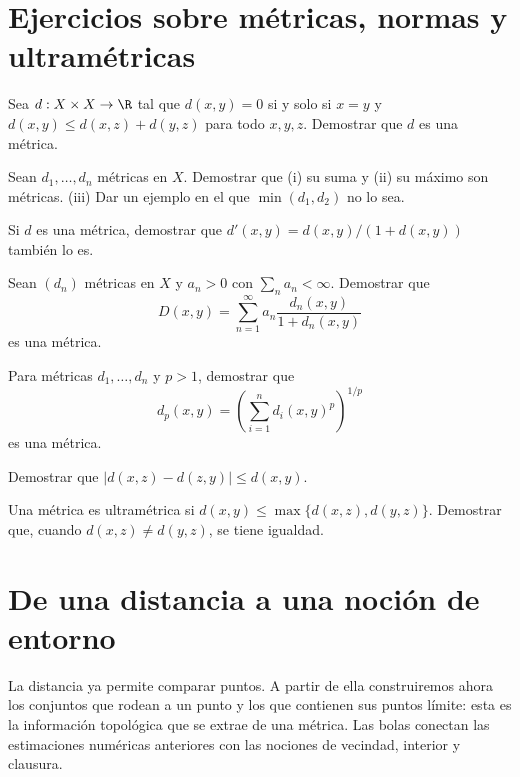 \section{Ejercicios sobre métricas, normas y ultramétricas}
\begin{ejercicio}\label{ej:lectura-1-1}
Sea $d:X\times X\to\R$ tal que $d(x,y)=0$ si y solo si $x=y$ y $d(x,y)\le d(x,z)+d(y,z)$ para todo $x,y,z$. Demostrar que $d$ es una métrica.
\end{ejercicio}


\begin{ejercicio}\label{ej:lectura-1-2}
Sean $d_1,\ldots,d_n$ métricas en $X$. Demostrar que (i) su suma y (ii) su máximo son métricas. (iii) Dar un ejemplo en el que $\min(d_1,d_2)$ no lo sea.
\end{ejercicio}


\begin{ejercicio}\label{ej:lectura-1-3}
Si $d$ es una métrica, demostrar que $d'(x,y)=d(x,y)/(1+d(x,y))$ también lo es.
\end{ejercicio}


\begin{ejercicio}\label{ej:lectura-1-4}
Sean $(d_n)$ métricas en $X$ y $a_n>0$ con $\sum_na_n<\infty$. Demostrar que
\[
D(x,y)=\sum_{n=1}^{\infty}a_n\frac{d_n(x,y)}{1+d_n(x,y)}
\]
es una métrica.
\end{ejercicio}


\begin{ejercicio}\label{ej:lectura-1-5}
Para métricas $d_1,\ldots,d_n$ y $p>1$, demostrar que
\[
d_p(x,y)=\left(\sum_{i=1}^n d_i(x,y)^p\right)^{1/p}
\]
es una métrica.
\end{ejercicio}


\begin{ejercicio}\label{ej:lectura-1-6}
Demostrar que $|d(x,z)-d(z,y)|\le d(x,y)$.
\end{ejercicio}


\begin{ejercicio}\label{ej:lectura-1-7}
Una métrica es ultramétrica si $d(x,y)\le\max\{d(x,z),d(y,z)\}$. Demostrar que, cuando $d(x,z)\ne d(y,z)$, se tiene igualdad.
\end{ejercicio}


\section{De una distancia a una noción de entorno}\label{lectura:02}
La distancia ya permite comparar puntos. A partir de ella construiremos ahora los conjuntos que rodean a un punto y los que contienen sus puntos límite: esta es la información topológica que se extrae de una métrica. Las bolas conectan las estimaciones numéricas anteriores con las nociones de vecindad, interior y clausura.

